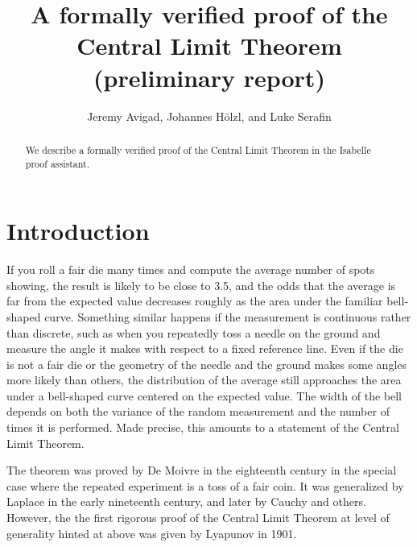 \documentclass{article}
\title{A formally verified proof of the\\ Central Limit Theorem\\(preliminary report)}
\author{Jeremy Avigad, Johannes H\"olzl, and Luke Serafin}
\begin{document}
\maketitle

\begin{abstract}
 We describe a formally verified proof of the Central Limit Theorem in the Isabelle proof assistant.
\end{abstract}

\section{Introduction}

If you roll a fair die many times and compute the average number of spots showing, the result is likely to be close to 3.5, and the odds that the average is far from the expected value decreases roughly as the area under the familiar bell-shaped curve. Something similar happens if the measurement is continuous rather than discrete, such as when you repeatedly toss a needle on the ground and measure the angle it makes with respect to a fixed reference line. Even if the die is not a fair die or the geometry of the needle and the ground makes some angles more likely than others, the distribution of the average still approaches the area under a bell-shaped curve centered on the expected value. The width of the bell depends on both the variance of the random measurement and the number of times it is performed. Made precise, this amounts to a statement of the Central Limit Theorem.

The theorem was proved by De Moivre in the eighteenth century in the special case where the repeated experiment is a toss of a fair coin. It was generalized by Laplace in the early nineteenth century, and later by Cauchy and others. However, the the first rigorous proof of the Central Limit Theorem at level of generality hinted at above was given by Lyapunov in 1901.
\end{document}
